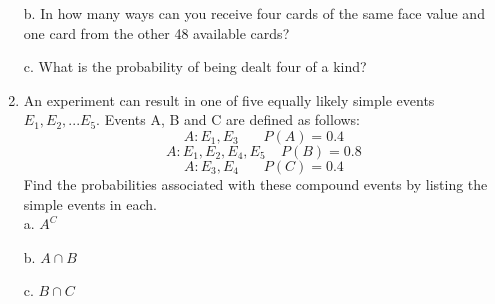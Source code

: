 \documentclass{article}
\begin{document}
\begin{enumerate}
b. In how many ways can you receive four cards of the same face value and one card from the other 48 available cards?

c. What is the probability of being dealt four of a kind?

\item An experiment can result in one of five equally likely simple events $E_1,E_2,...E_5.$ Events A, B and C are defined as follows: \\ 
$$ A:E_1,E_3 \:\:\:\:\:\:\:\: P(A) = 0.4 $$
$$ A:E_1,E_2,E_4,E_5 \:\:\:\:\: P(B) = 0.8 $$
$$ A:E_3,E_4 \:\:\:\:\:\:\:\: P(C) = 0.4 $$
Find the probabilities associated with these compound events by listing the simple events in each. \\
a. $A^C$

b. $A \cap B$

c. $B \cap C$









\end{enumerate}
\end{document}
